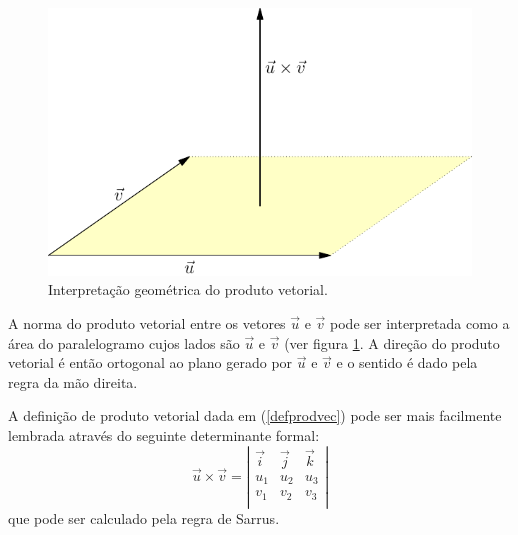 \begin{figure}%
\begin{center}
     \includegraphics[width=\textwidth]{./cap_algvet/figs/prod_vec_paralelogramo}
      \caption{Interpretação geométrica do produto vetorial.}\label{fig:prod_paralelo}
      \end{center}
  \end{figure}

  A norma do produto vetorial entre os vetores $\vec{u}$ e $\vec{v}$ pode ser interpretada como a área do paralelogramo cujos lados são $\vec{u}$ e $\vec{v}$ (ver figura \ref{fig:prod_paralelo}. A direção do produto vetorial é então ortogonal ao plano gerado por  $\vec{u}$ e $\vec{v}$  e o sentido é dado pela regra da mão direita.




A definição de produto vetorial dada em (\ref{defprodvec}) pode ser mais facilmente lembrada através do seguinte determinante formal:
\begin{equation}\label{detprodvec}
\vec{u}\times\vec{v}=\left|\begin{array}{ccc}
\vec{i}&\vec{j}&\vec{k}\\
u_1 & u_2 & u_3\\
v_1 & v_2 & v_3\\
\end{array}
\right|
\end{equation}
que pode ser calculado pela regra de Sarrus.


